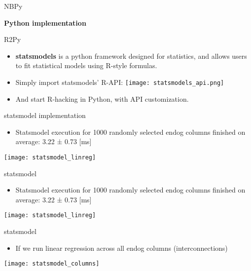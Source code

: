 \documentclass[english,aspectratio=169]{beamer}
\begin{document}
\begin{frame}{NBPy}%

  \begin{center}
        \textbf{\Large Python implementation}
  \end{center}

\end{frame}

\begin{frame}{R2Py}%

  \begin{itemize}
    \item \textbf{statsmodels} is a python framework designed for statistics, and allows users to fit statistical models using R-style formulas.
    \item Simply import statsmodels' R-API:
    \texttt{[image: statsmodels\_api.png]}\\[0.15cm]
    \item And start R-hacking in Python, with API customization.
  \end{itemize}


\end{frame}


\begin{frame}{statsmodel implementation}
    \begin{itemize}
        \item Statsmodel execution for 1000 randomly selected endog columns finished on average: 3.22 ± 0.73 [ms]
    \end{itemize}
    \begin{center}
        \texttt{[image: statsmodel\_linreg]}
    \end{center}

\end{frame}

\begin{frame}{statsmodel}
    \begin{itemize}
        \item Statsmodel execution for 1000 randomly selected endog columns finished on average: 3.22 ± 0.73 [ms]
    \end{itemize}
    \begin{center}
        \texttt{[image: statsmodel\_linreg]}
    \end{center}

\end{frame}


\begin{frame}{statsmodel}
    \begin{itemize}
        \item If we run linear regression across all endog columns (interconnections)
    \end{itemize}
    \begin{center}
        \texttt{[image: statsmodel\_columns]}
    \end{center}
\end{frame}
\end{document}
